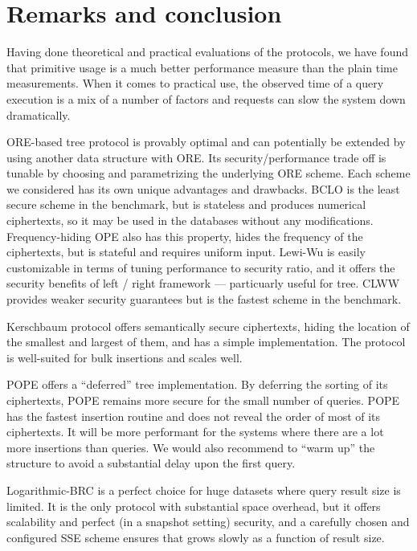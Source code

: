 \section{Remarks and conclusion}\label{section:range-snapshot:conclusion}

	Having done theoretical and practical evaluations of the protocols, we have found that primitive usage is a much better performance measure than the plain time measurements.
	When it comes to practical use, the observed time of a query execution is a mix of a number of factors and {\IO} requests can slow the system down dramatically.

	ORE-based {\BPlus} tree protocol is provably {\IO} optimal and can potentially be extended by using another data structure with ORE\@.
	Its security/performance trade off is tunable by choosing and parametrizing the underlying ORE scheme.
	Each scheme we considered has its own unique advantages and drawbacks.
	BCLO \cite{bclo-ope} is the least secure scheme in the benchmark, but is stateless and produces numerical ciphertexts, so it may be used in the databases without any modifications.
	Frequency-hiding OPE \cite{fh-ope} also has this property, hides the frequency of the ciphertexts, but is stateful and requires uniform input.
	Lewi-Wu \cite{lewi-wu-ore} is easily customizable in terms of tuning performance to security ratio, and it offers the security benefits of left / right framework --- particuarly useful for {\BPlus} tree.
	CLWW \cite{clww-ore} provides weaker security guarantees but is the fastest scheme in the benchmark.

	Kerschbaum protocol \cite{florian-protocol} offers semantically secure ciphertexts, hiding the location of the smallest and largest of them, and has a simple implementation.
	The protocol is well-suited for bulk insertions and scales well.

	\balance%

	POPE \cite{pope} offers a ``deferred'' {\BPlus} tree implementation.
	By deferring the sorting of its ciphertexts, POPE remains more secure for the small number of queries.
	POPE has the fastest insertion routine and does not reveal the order of most of its ciphertexts.
	It will be more performant for the systems where there are a lot more insertions than queries.
	We would also recommend to ``warm up'' the structure to avoid a substantial delay upon the first query.

	Logarithmic\hyp{}BRC is a perfect choice for huge datasets where query result size is limited.
	It is the only protocol with substantial space overhead, but it offers scalability and perfect (in a snapshot setting) security,
	and a carefully chosen and configured SSE scheme ensures that {\IO} grows slowly as a function of result size.

